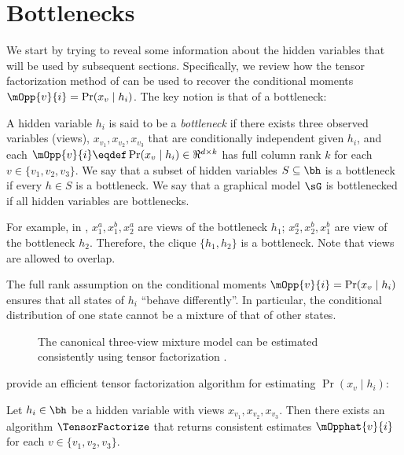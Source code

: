 \section{Bottlenecks}
\label{sec:bottlenecks}

We start by trying to reveal some information about the hidden variables
that will be used by subsequent sections.
Specifically, we review how
the tensor factorization method of \citet{anandkumar13tensor}
can be used to recover the conditional moments
$\mOpp{v}{i} = \Pr(x_v \mid h_i)$.
The key notion is that of a bottleneck:

\begin{definition}[Bottleneck]
  \label{def:bottleneck}
  A hidden variable $h_i$ is said to be a \emph{bottleneck} if there
  exists three observed variables (views), $x_{v_1}, x_{v_2}, x_{v_3}$
  that are conditionally independent given $h_i$,
  and each $\mOpp{v}{i} \eqdef \Pr(x_v \mid h_i) \in \Re^{d \times k}$ has full column rank $k$
  for each $v \in \{v_1, v_2, v_3\}$.
  We say that a subset of hidden variables $S \subseteq \bh$ is a bottleneck
  if every $h \in S$ is a bottleneck.
  We say that a graphical model $\sG$ is bottlenecked if all hidden variables
  are bottlenecks.
\end{definition}
For example, in , $x_1^a,x_1^b,x_2^a$ are views of the bottleneck $h_1$;
$x_2^a,x_2^b,x_1^b$ are view of the bottleneck $h_2$.  Therefore, the clique
$\{h_1,h_2\}$ is a bottleneck.  Note that views are allowed to overlap.

The full rank assumption on the conditional moments $\mOpp{v}{i} = \Pr(x_v \mid h_i)$
ensures that all states of $h_i$ ``behave differently''.
In particular, the conditional distribution of one state cannot be
a mixture of that of other states.

\begin{figure}[t]
  \label{fig:three-view}
  \centering
  
  \caption{The canonical three-view mixture model can be estimated consistently
  using tensor factorization \citep{anandkumar13tensor}.}
\end{figure}

\citet{anandkumar12moments} provide an efficient tensor factorization algorithm
for estimating $\Pr(x_v \mid h_i)$:
\begin{theorem}
Let $h_i \in \bh$ be a hidden variable
with views $x_{v_1},x_{v_2},x_{v_3}$.
Then there exists an algorithm $\TensorFactorize$ that
returns consistent estimates $\mOpphat{v}{i}$ for each $v \in \{v_1,v_2,v_3\}$.
\end{theorem}

